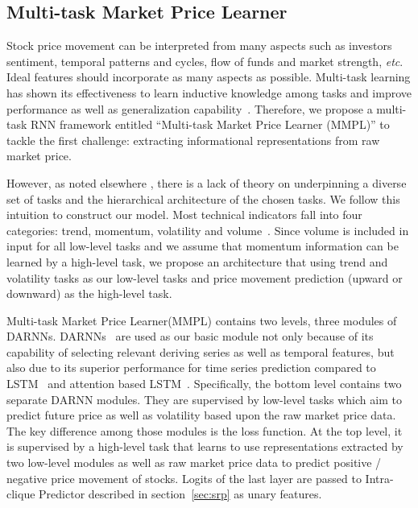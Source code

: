 \subsection{Multi-task Market Price Learner}
\label{sec:mmpl}

Stock price movement can be interpreted from many aspects such as
investors sentiment, temporal patterns and cycles, flow of funds
and market strength, \textit{etc}. Ideal features should
incorporate as many aspects as possible. Multi-task learning
has shown its effectiveness to learn inductive knowledge among
tasks and improve performance as well as generalization
capability~\cite{caruana1993multitask}. Therefore, we propose a
multi-task RNN framework entitled ``Multi-task Market Price
Learner (MMPL)'' to tackle the first challenge: extracting
informational representations from raw market price.

However, as noted elsewhere
\cite{caruana1993multitask,ruder2017overview}, there is a lack of
theory on underpinning a diverse set of tasks and the
hierarchical architecture of the chosen tasks. We follow this
intuition to construct our model. Most technical indicators fall
into four categories: trend, momentum, volatility and
volume~\cite{kirkpatrick2010technical}. Since volume is included
in input for all low-level tasks and we assume that momentum
information can be learned by a high-level task, we propose an
architecture that using trend and volatility tasks as our low-level tasks and price movement prediction (upward or downward) as
the high-level task.


Multi-task Market Price Learner(MMPL) contains two
levels, three modules of DARNNs. DARNNs~\cite{qin2017dual} are
used as our basic module not only because of its capability of
selecting relevant deriving series as well as temporal features,
but also due to its superior performance for time series
prediction compared to LSTM~\cite{hochreiter1997long} and
attention based LSTM~\cite{attention}. Specifically, the bottom
level contains two separate DARNN modules. They are supervised by
low-level tasks which aim to predict future price as well as
volatility based upon the raw market price data. The key
difference among those modules is the loss function. At the top
level, it is supervised by a high-level task that learns to use
representations extracted by two low-level modules as well as raw
market price data to predict positive / negative price movement
of stocks. Logits of the last layer are passed to Intra-clique
Predictor described in section~\ref{sec:srp} as unary features.

